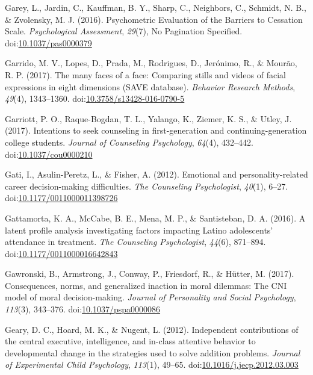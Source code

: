 \documentclass[english,man]{apa6}
\theoremstyle{definition}
\theoremstyle{definition}
\theoremstyle{definition}
\theoremstyle{remark}
\begin{document}
\hypertarget{ref-Garey2017}{}
Garey, L., Jardin, C., Kauffman, B. Y., Sharp, C., Neighbors, C.,
Schmidt, N. B., \& Zvolensky, M. J. (2016). Psychometric Evaluation of
the Barriers to Cessation Scale. \emph{Psychological Assessment},
\emph{29}(7), No Pagination Specified.
doi:\href{https://doi.org/10.1037/pas0000379}{10.1037/pas0000379}

\hypertarget{ref-Garrido2016}{}
Garrido, M. V., Lopes, D., Prada, M., Rodrigues, D., Jerónimo, R., \&
Mourão, R. P. (2017). The many faces of a face: Comparing stills and
videos of facial expressions in eight dimensions (SAVE database).
\emph{Behavior Research Methods}, \emph{49}(4), 1343--1360.
doi:\href{https://doi.org/10.3758/s13428-016-0790-5}{10.3758/s13428-016-0790-5}

\hypertarget{ref-Garriott2017}{}
Garriott, P. O., Raque-Bogdan, T. L., Yalango, K., Ziemer, K. S., \&
Utley, J. (2017). Intentions to seek counseling in first-generation and
continuing-generation college students. \emph{Journal of Counseling
Psychology}, \emph{64}(4), 432--442.
doi:\href{https://doi.org/10.1037/cou0000210}{10.1037/cou0000210}

\hypertarget{ref-Gati2012}{}
Gati, I., Asulin-Peretz, L., \& Fisher, A. (2012). Emotional and
personality-related career decision-making difficulties. \emph{The
Counseling Psychologist}, \emph{40}(1), 6--27.
doi:\href{https://doi.org/10.1177/0011000011398726}{10.1177/0011000011398726}

\hypertarget{ref-Gattamorta2016}{}
Gattamorta, K. A., McCabe, B. E., Mena, M. P., \& Santisteban, D. A.
(2016). A latent profile analysis investigating factors impacting Latino
adolescents' attendance in treatment. \emph{The Counseling
Psychologist}, \emph{44}(6), 871--894.
doi:\href{https://doi.org/10.1177/0011000016642843}{10.1177/0011000016642843}

\hypertarget{ref-Gawronski2017}{}
Gawronski, B., Armstrong, J., Conway, P., Friesdorf, R., \& Hütter, M.
(2017). Consequences, norms, and generalized inaction in moral dilemmas:
The CNI model of moral decision-making. \emph{Journal of Personality and
Social Psychology}, \emph{113}(3), 343--376.
doi:\href{https://doi.org/10.1037/pspa0000086}{10.1037/pspa0000086}

\hypertarget{ref-Geary2012}{}
Geary, D. C., Hoard, M. K., \& Nugent, L. (2012). Independent
contributions of the central executive, intelligence, and in-class
attentive behavior to developmental change in the strategies used to
solve addition problems. \emph{Journal of Experimental Child
Psychology}, \emph{113}(1), 49--65.
doi:\href{https://doi.org/10.1016/j.jecp.2012.03.003}{10.1016/j.jecp.2012.03.003}
\end{document}
